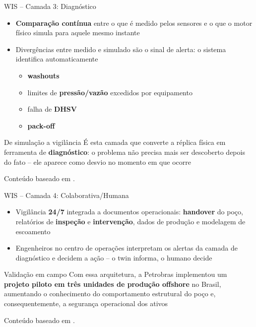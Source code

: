 \documentclass[aspectratio=169,xcolor=dvipsnames]{beamer}
\begin{document}
\begin{frame}{WIS -- Camada 3: Diagnóstico}
    \begin{itemize}\setlength\itemsep{6pt}
        \item \textbf{Comparação contínua} entre o que é medido pelos sensores e o que o motor físico simula para aquele mesmo instante
        \item Divergências entre medido e simulado são o sinal de alerta: o sistema identifica automaticamente
        \begin{itemize}
            \item \textbf{washouts}
            \item limites de \textbf{pressão/vazão} excedidos por equipamento
            \item falha de \textbf{DHSV}
            \item \textbf{pack-off}
        \end{itemize}
    \end{itemize}
    \begin{exampleblock}{De simulação a vigilância}
        É esta camada que converte a réplica física em ferramenta de \textbf{diagnóstico}: o problema não precisa mais ser descoberto depois do fato -- ele aparece como desvio no momento em que ocorre
    \end{exampleblock}
    \vfill
    \footnotesize Conteúdo baseado em \cite{otc2020}.
\end{frame}

\begin{frame}{WIS -- Camada 4: Colaborativa/Humana}
    \begin{itemize}\setlength\itemsep{6pt}
        \item Vigilância \textbf{24/7} integrada a documentos operacionais: \textbf{handover} do poço, relatórios de \textbf{inspeção} e \textbf{intervenção}, dados de produção e modelagem de escoamento
        \item Engenheiros no centro de operações interpretam os alertas da camada de diagnóstico e decidem a ação -- o twin informa, o humano decide
    \end{itemize}
    \begin{exampleblock}{Validação em campo}
        Com essa arquitetura, a Petrobras implementou um \textbf{projeto piloto em três unidades de produção offshore} no Brasil, aumentando o conhecimento do comportamento estrutural do poço e, consequentemente, a segurança operacional dos ativos
    \end{exampleblock}
    \vfill
    \footnotesize Conteúdo baseado em \cite{otc2020}.
\end{frame}
\end{document}
